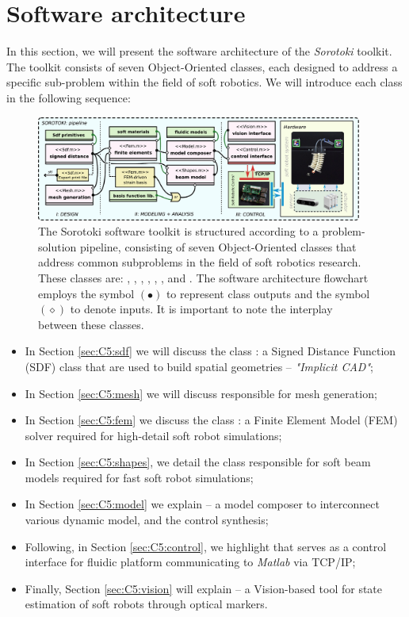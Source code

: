 \section{Software architecture}
\label{sec:C5:software}
In this section, we will present the software architecture of the \textit{Sorotoki} toolkit. The toolkit consists of seven Object-Oriented classes, each designed to address a specific sub-problem within the field of soft robotics. We will introduce each class in the following sequence:

\begin{figure}
\includegraphics[width=0.955\textwidth]{./pdf/thesis-figure-6-2.pdf}    
\centering
\caption{The Sorotoki software toolkit is structured according to a problem-solution pipeline, consisting of seven Object-Oriented classes that address common subproblems in the field of soft robotics research. These classes are: , , , , , , and . The software architecture flowchart employs the symbol $(\bullet)$ to represent class outputs and the symbol $(\diamond)$ to denote inputs. It is important to note the interplay between these classes. \label{fig:C5:softwareArchitecture}}
\end{figure}
%
\begin{itemize}
    \setlength\itemsep{0.0em}
    \item In Section \ref{sec:C5:sdf} we will discuss the class : a Signed Distance Function (SDF) class that are used to build spatial geometries --  \emph{"Implicit CAD"};
    \item In Section \ref{sec:C5:mesh} we will discuss  responsible for mesh generation;
    \item In Section \ref{sec:C5:fem} we discuss the class : a Finite Element Model (FEM) solver required for high-detail soft robot simulations;
    \item In Section \ref{sec:C5:shapes}, we detail the class  responsible for soft beam models required for fast soft robot simulations;
    \item In Section \ref{sec:C5:model} we explain  -- a model composer to interconnect various dynamic model, and the control synthesis;
    \item Following, in Section \ref{sec:C5:control}, we highlight  that serves as a control interface for fluidic platform communicating to \textit{Matlab} via TCP/IP;
    \item Finally, Section \ref{sec:C5:vision} will explain  -- a Vision-based tool for state estimation of soft robots through optical markers.
\end{itemize}
